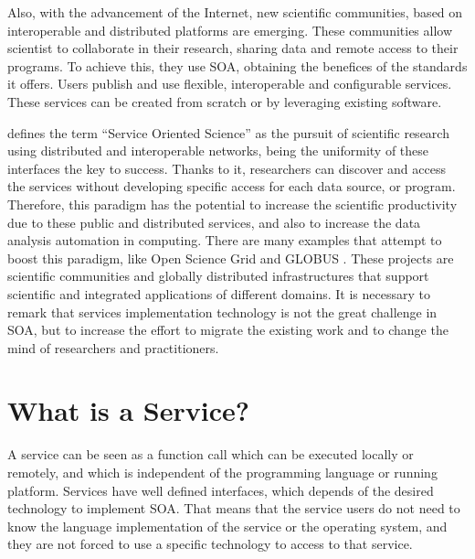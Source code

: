 Also, with the advancement of the Internet, new scientific communities, based on interoperable and distributed platforms are emerging. These communities allow scientist to collaborate in their research, sharing data and remote access to their programs. To achieve this, they use SOA, obtaining the benefices of the standards it offers. Users publish and use flexible, interoperable and configurable services. These services can be created from scratch or by leveraging existing software. 

 \cite{Foster2005Science} defines the term ``Service Oriented
Science'' as the pursuit of scientific research using distributed and
interoperable networks, being the uniformity of
these interfaces the key to success. Thanks to it, researchers can discover and access
the services without developing specific access for each data source, or
program. Therefore, this paradigm has the potential to increase the
scientific productivity due to these public and distributed services, and also to increase the data analysis automation in computing. There are many examples that attempt to boost this paradigm, like Open Science Grid \citep{Altunay2011OpenScience} and GLOBUS \citep{Foster2005Globus}. These projects are scientific communities and globally distributed infrastructures that support scientific and integrated applications of different domains.
It is necessary to remark that services implementation technology is not the
great challenge in SOA, but to increase the effort to migrate the
existing work and to change the mind of researchers and
practitioners. 

\section{What is a Service?}

\lettrine{A}{} service can be seen as a function call which can be executed locally or remotely, and which is independent of the programming language or running platform. Services have well defined interfaces, which depends of the desired technology to implement SOA. That means that the service users do not need to know the language implementation of the service or the operating system, and they are not forced to use a specific technology to access to that service.

